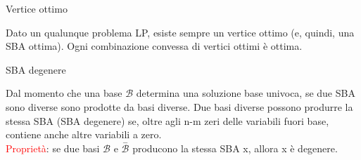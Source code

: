 \documentclass[answers, a4paper, 11pt]{exam}
\begin{document}
\begin{questions}
\begin{solution}
\end{solution}
\question Vertice ottimo
\begin{solution}
Dato un qualunque problema LP, esiste sempre un vertice ottimo (e, quindi, una SBA ottima). Ogni combinazione convessa di vertici ottimi è ottima.
\end{solution}
\question SBA degenere
\begin{solution}
Dal momento che una base $\mathcal{B}$ determina una soluzione base univoca, se due SBA sono diverse sono prodotte da basi diverse. Due basi diverse possono produrre la stessa SBA (SBA degenere) se, oltre agli n-m zeri delle variabili fuori base, contiene anche altre variabili a zero.\\
\textcolor{red}{Proprietà}: se due basi $\mathcal{B}$ e $\stackrel{-}{\mathcal{B}}$ producono la stessa SBA x, allora x è degenere. 
\end{solution}
\end{questions}
\end{document}
